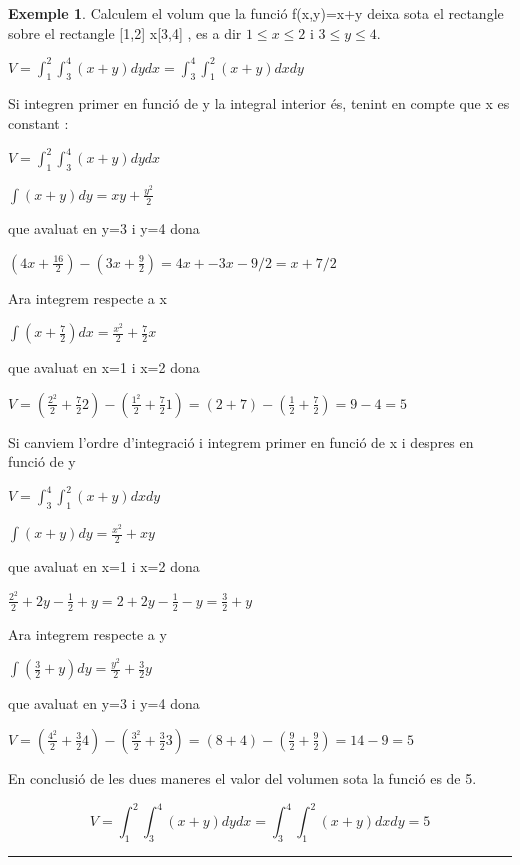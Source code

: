 \documentclass[
  catalan,
]{article}
\theoremstyle{definition}
\theoremstyle{definition}
\newtheorem{example}{Exemple}[section]
\theoremstyle{definition}
\theoremstyle{definition}
\theoremstyle{remark}
\begin{document}
\begin{example}
\protect\hypertarget{exm:densitat1}{}\label{exm:densitat1}Calculem el volum que la funció f(x,y)=x+y deixa sota el rectangle sobre el rectangle {[}1,2{]} x{[}3,4{]} , es a dir \(1 \leq x \leq 2\) i \(3 \leq y \leq 4\).

\(V= \int_{1}^{2}\int_{3}^{4} (x+y)dydx=\int_{3}^{4}\int_{1}^{2}(x+y)dxdy\)

Si integren primer en funció de y la integral interior és, tenint en compte que x es constant :

\(V= \int_{1}^{2}\int_{3}^{4} (x+y)dydx\)

\(\int (x+y)dy= xy+\frac{y^2}{2}\)

que avaluat en y=3 i y=4 dona

\((4x+\frac{16}{2}) - (3x+\frac{9}{2})=4x+-3x-9/2=x+7/2\)

Ara integrem respecte a x

\(\int (x+\frac{7}{2})dx=\frac {x^2}{2}+\frac{7}{2}x\)

que avaluat en x=1 i x=2 dona

\(V=(\frac {2^2}{2}+\frac {7}{2}2)-(\frac {1^2}{2}+\frac {7}{2}1)=(2+7)-(\frac {1}{2}+\frac {7}{2})=9-4=5\)

Si canviem l'ordre d'integració i integrem primer en funció de x i despres en funció de y

\(V=\int_{3}^{4}\int_{1}^{2}(x+y)dxdy\)

\(\int (x+y)dy= \frac{x^2}{2}+xy\)

que avaluat en x=1 i x=2 dona

\(\frac{2^2}{2}+2y -\frac{1}{2}+y=2+2y-\frac{1}{2}-y=\frac{3}{2}+y\)

Ara integrem respecte a y

\(\int (\frac{3}{2}+y) dy= \frac {y^2}{2} +\frac {3}{2}y\)

que avaluat en y=3 i y=4 dona

\(V=(\frac {4^2}{2} +\frac {3}{2}4)-(\frac {3^2}{2} +\frac {3}{2}3)=(8+4)-(\frac {9}{2} +\frac {9}{2})=14-9=5\)

En conclusió de les dues maneres el valor del volumen sota la funció es de 5.

\[
V= \int_{1}^{2}\int_{3}^{4} (x+y)dydx=\int_{3}^{4}\int_{1}^{2}(x+y)dxdy=5
\]
\end{example}

\begin{center}\rule{0.5\linewidth}{0.5pt}\end{center}
\end{document}
